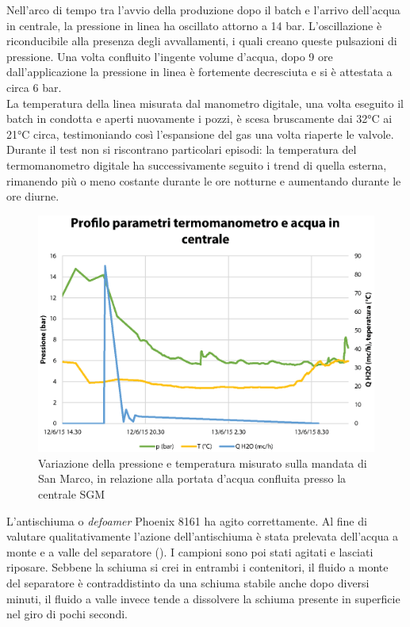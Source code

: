 Nell'arco di tempo tra l'avvio della produzione dopo il batch e l'arrivo dell'acqua in centrale, la pressione in linea ha oscillato attorno a 14 bar. L'oscillazione è riconducibile alla presenza degli avvallamenti, i quali creano queste pulsazioni di pressione. Una volta confluito l'ingente volume d'acqua, dopo 9 ore dall'applicazione la pressione in linea è fortemente decresciuta e si è attestata a circa 6 bar. \\
La temperatura della linea misurata dal manometro digitale, una volta eseguito il batch in condotta e aperti nuovamente i pozzi, è scesa bruscamente dai 32°C ai 21°C circa, testimoniando così l'espansione del gas una volta riaperte le valvole. Durante il test non si riscontrano particolari episodi: la temperatura del termomanometro digitale ha successivamente seguito i trend di quella esterna, rimanendo più o meno costante durante le ore notturne e aumentando durante le ore diurne.\\
\begin{figure}[htbp]
    \centering
    \includegraphics[width=\textwidth]{fig/test/graphs/profili.eps}
    \caption{Variazione della pressione e temperatura misurato sulla mandata di San Marco, in relazione alla portata d'acqua confluita presso la centrale SGM} 
    \label{fig:test-profili}
\end{figure}
L’antischiuma o \textit{defoamer} Phoenix 8161 ha agito correttamente. Al fine di valutare qualitativamente l’azione dell'antischiuma è stata prelevata dell'acqua a monte e a valle del separatore (). I campioni sono poi stati agitati e lasciati riposare. Sebbene la schiuma si crei in entrambi i contenitori, il fluido a monte del separatore è contraddistinto da una schiuma stabile anche dopo diversi minuti, il fluido a valle invece tende a dissolvere la schiuma presente in superficie nel giro di pochi secondi.

